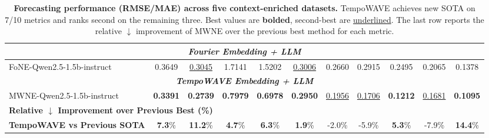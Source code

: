 \begin{table}[t]
\begin{footnotesize}
{\begin{tabular}{lcccccccccc}
\multicolumn{11}{c}{\textbf{\textit{Fourier Embedding + LLM}}} \\
\midrule
FoNE-Qwen2.5-1.5b-instruct & 0.3649 & \underline{0.3045} & 1.7141 & 1.5202 & \underline{0.3006} & 0.2660 & 0.2915 & 0.2495 & 0.2065 & 0.1378 \\
\midrule

\multicolumn{11}{c}{\textbf{\textit{TempoWAVE Embedding + LLM}}} \\
\midrule
MWNE-Qwen2.5-1.5b-instruct & \textbf{0.3391} & \textbf{0.2739} & \textbf{0.7979} & \textbf{0.6978} & \textbf{0.2950} & \underline{0.1956} & \underline{0.1706} & \textbf{0.1212} & \underline{0.1681} & \textbf{0.1095} \\
\midrule

\multicolumn{11}{l}{\textbf{Relative $\downarrow$ Improvement over Previous Best (\%)}} \\
\midrule
\textbf{TempoWAVE vs Previous SOTA} & \textbf{7.3}\% & \textbf{11.2}\% & \textbf{4.7}\% & \textbf{6.3}\% & \textbf{1.9}\% & -2.0\% & -5.9\% & \textbf{5.3}\% & -7.9\% & \textbf{14.4}\% \\
\bottomrule
\end{tabular}
}
\caption{
\textbf{Forecasting performance (RMSE/MAE) across five context-enriched datasets.}
TempoWAVE achieves new SOTA on 7/10 metrics and ranks second on the remaining three.
Best values are \textbf{bolded}, second-best are \underline{underlined}.
The last row reports the relative $\downarrow$ improvement of MWNE over the previous best method for each metric.
}
\label{tab:ForecastPerformanceNew}
\end{footnotesize}
\vskip -0.15in
\end{table}


